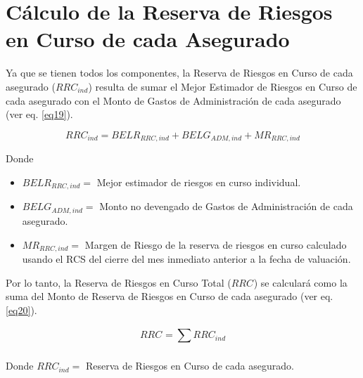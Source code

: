 \documentclass[11pt,twoside,openright,spanish]{report}
\numberwithin{equation}{chapter}
\numberwithin{figure}{chapter}
\numberwithin{table}{chapter}
\begin{document}
	 

 
	

	
	

 
	
	\section{Cálculo de la Reserva de Riesgos en Curso de cada Asegurado}
	
	 
	Ya que se tienen todos los componentes, la Reserva de Riesgos en Curso de cada asegurado ($RRC_{ind}$) resulta de sumar el Mejor Estimador de Riesgos en Curso de cada asegurado con el Monto de Gastos de Administración de cada asegurado (ver eq. \ref{eq19}).
	
\begin{equation}
		{RRC}_{ind}^{}={{BELR}_{RRC,ind}+BELG_{ADM,ind} +MR_{RRC,ind}
		}
	\label{eq19}
		\end{equation}	
			
	Donde
	 
		\begin{itemize}
		\setlength\itemsep{-0.5em}
	\item $BELR_{RRC,ind}=$ Mejor estimador de riesgos en curso individual.
	
	\item $BELG_{ADM,ind}^{}=$ Monto no devengado de Gastos de Administración de cada asegurado.
	
		\item $MR_{RRC,ind}^{}=$ Margen de Riesgo de la reserva de riesgos en curso calculado usando el RCS del cierre del mes inmediato anterior a la fecha de valuación.
	\end{itemize}
	



		
	Por lo tanto, la Reserva de Riesgos en Curso Total ($RRC_{}$) se calculará como la suma del Monto de Reserva de Riesgos en Curso de cada asegurado (ver eq. \ref{eq20}).
	
\begin{equation}
		RRC_{}={\sum _{}^{}RRC_{ind}^{}}
		\label{eq20}
	\end{equation}
		
	
	Donde $RRC_{ind}^{}=$ Reserva de Riesgos en Curso de cada asegurado.
	


 

\clearpage
\appendix 
\end{document}
